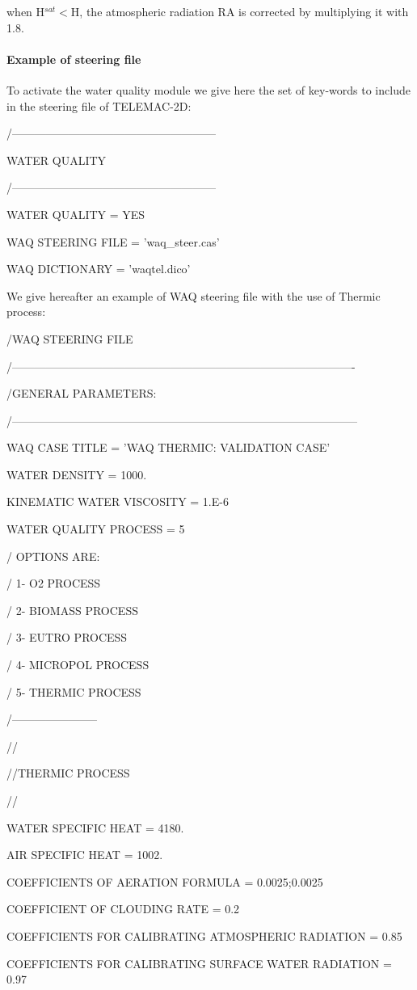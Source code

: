  when H${}^{sat}<$H, the atmospheric radiation RA is corrected by multiplying it with 1.8.


\paragraph{ Example of steering file}

 To activate the water quality module we give here the set of key-words to include in the steering file of TELEMAC-2D:

 /------------------------------------------------------

   WATER QUALITY

 /------------------------------------------------------

 WATER QUALITY           = YES

 WAQ STEERING FILE    = 'waq\_steer.cas'

 WAQ DICTIONARY         = 'waqtel.dico'

 We give hereafter an example of WAQ steering file with the use of Thermic process:



 /WAQ STEERING FILE

 /-------------------------------------------------------------------------------------------

 /GENERAL PARAMETERS:

 /--------------------------------------------------------------------------------------------

 WAQ CASE TITLE                = 'WAQ THERMIC: VALIDATION CASE'

 WATER DENSITY                 = 1000.

 KINEMATIC WATER VISCOSITY      = 1.E-6

 WATER QUALITY PROCESS         = 5

 /   OPTIONS ARE:

 /       1- O2 PROCESS

 /       2- BIOMASS PROCESS

 /       3- EUTRO PROCESS

 /       4- MICROPOL PROCESS

 /       5- THERMIC PROCESS

 /-----------------------

 //

 //THERMIC PROCESS

 //

 WATER SPECIFIC HEAT                                 = 4180.

 AIR SPECIFIC HEAT                                        = 1002.

 COEFFICIENTS OF AERATION FORMULA    = 0.0025;0.0025

 COEFFICIENT OF CLOUDING RATE                       = 0.2

 COEFFICIENTS FOR CALIBRATING ATMOSPHERIC RADIATION = 0.85

 COEFFICIENTS FOR CALIBRATING SURFACE WATER RADIATION = 0.97




